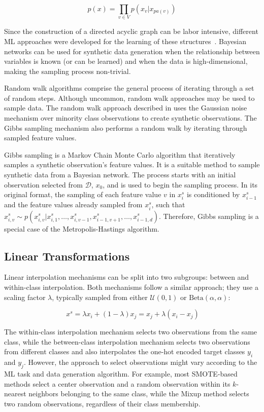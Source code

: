 \begin{equation}
    p(x) = \prod_{v \in V} p(x_v | x_{pa(v)})
\end{equation}

Since the construction of a directed acyclic graph can be labor intensive,
different ML approaches were developed for the learning of these
structures~\cite{yu2019dag}. Bayesian networks can be used for synthetic data
generation when the relationship between variables is known (or can be
learned) and when the data is high-dimensional, making the sampling process
non-trivial.

Random walk algorithms comprise the general process of iterating through a set
of random steps. Although uncommon, random walk approaches may be used to
sample data. The random walk approach described in \cite{zhang2014rwo} uses
the Gaussian noise mechanism over minority class observations to create
synthetic observations. The Gibbs sampling mechanism also performs a random
walk by iterating through sampled feature values.

Gibbs sampling is a Markov Chain Monte Carlo algorithm that iteratively
samples a synthetic observation's feature values. It is a suitable method to
sample synthetic data from a Bayesian network. The process starts with an
initial observation selected from $\mathcal{D}$, $x_0$, and is used to begin
the sampling process. In its original format, the sampling of each feature
value $v$ in $x^s_i$ is conditioned by $x^s_{i-1}$ and the feature values
already sampled from $x^s_i$, such that $x^s_{i, v} \sim p(x^s_{i, v} |
x^s_{i, 1}, \ldots, x^s_{i, v-1}, x^s_{i-1, v+1}, \dots, x^s_{i-1, d})$.
Therefore, Gibbs sampling is a special case of the Metropolis-Hastings
algorithm.

\subsection{Linear Transformations}

Linear interpolation mechanisms can be split into two subgroups: between and
within-class interpolation. Both mechanisms follow a similar approach; they
use a scaling factor $\lambda$, typically sampled from either
$\mathcal{U}(0,1)$ or $\text{Beta}(\alpha, \alpha)$: 

\begin{equation}~\label{eq:interpolation}
    x^s = \lambda x_i + (1-\lambda)x_j = x_j + \lambda(x_i - x_j)
\end{equation}

The within-class interpolation mechanism selects two observations from the
same class, while the between-class interpolation mechanism selects two
observations from different classes and also interpolates the one-hot encoded
target classes $y_i$ and $y_j$. However, the approach to select observations
might vary according to the ML task and data generation algorithm. For
example, most SMOTE-based methods select a center observation and a random
observation within its $k$-nearest neighbors belonging to the same class,
while the Mixup method selects two random observations, regardless of their
class membership.

